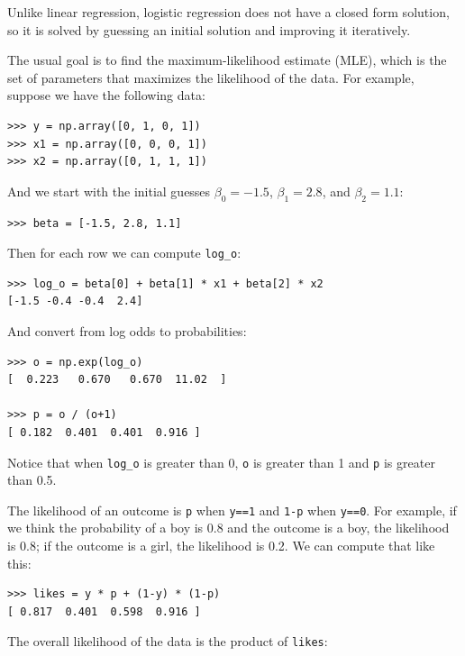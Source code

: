 \documentclass[12pt]{book}
\begin{document}
Unlike linear regression, logistic regression does not have a
closed form solution, so it is solved by guessing an initial
solution and improving it iteratively.

The usual goal is to find the maximum-likelihood estimate (MLE),
which is the set of parameters that maximizes the likelihood of the
data.  For example, suppose we have the following data:

\begin{verbatim}
>>> y = np.array([0, 1, 0, 1])
>>> x1 = np.array([0, 0, 0, 1])
>>> x2 = np.array([0, 1, 1, 1])
\end{verbatim}

And we start with the initial guesses $\beta_0=-1.5$, $\beta_1=2.8$,
and $\beta_2=1.1$:

\begin{verbatim}
>>> beta = [-1.5, 2.8, 1.1]
\end{verbatim}

Then for each row we can compute \verb"log_o":

\begin{verbatim}
>>> log_o = beta[0] + beta[1] * x1 + beta[2] * x2 
[-1.5 -0.4 -0.4  2.4]
\end{verbatim}

And convert from log odds to probabilities:

\begin{verbatim}
>>> o = np.exp(log_o)
[  0.223   0.670   0.670  11.02  ]

>>> p = o / (o+1)
[ 0.182  0.401  0.401  0.916 ]
\end{verbatim}

Notice that when \verb"log_o" is greater than 0, \verb"o"
is greater than 1 and \verb"p" is greater than 0.5.

The likelihood of an outcome is \verb"p" when \verb"y==1" and \verb"1-p"
when \verb"y==0".  For example, if we think the probability of a boy is
0.8 and the outcome is a boy, the likelihood is 0.8; if
the outcome is a girl, the likelihood is 0.2.  We can compute that
like this:

\begin{verbatim}
>>> likes = y * p + (1-y) * (1-p)
[ 0.817  0.401  0.598  0.916 ]
\end{verbatim}

The overall likelihood of the data is the product of \verb"likes":
\end{document}
